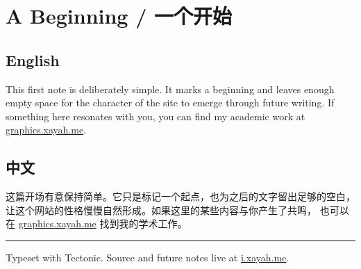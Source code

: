 \documentclass[11pt,a4paper,fontset=fandol]{ctexart}
\newcommand{\languagepair}[2]{%
  \subsection{English}
  #1
  \subsection{中文}
  #2
}
\begin{document}
\section{A Beginning / 一个开始}

\languagepair{
  This first note is deliberately simple. It marks a beginning and leaves
  enough empty space for the character of the site to emerge through future
  writing. If something here resonates with you, you can find my academic work
  at \href{https://graphics.xayah.me/}{graphics.xayah.me}.
}{
  这篇开场有意保持简单。它只是标记一个起点，也为之后的文字留出足够的空白，
  让这个网站的性格慢慢自然形成。如果这里的某些内容与你产生了共鸣，
  也可以在 \href{https://graphics.xayah.me/}{graphics.xayah.me} 找到我的学术工作。
}

\vfill
{\color{rulecolor}\rule{\textwidth}{0.5pt}\par}
{\small\color{softink}Typeset with Tectonic. Source and future notes live at
\href{https://i.xayah.me/}{i.xayah.me}.\par}
\end{document}
